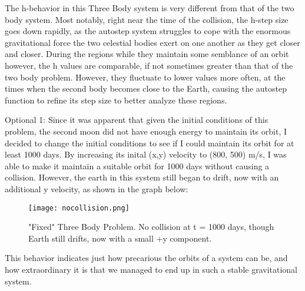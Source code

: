 \documentclass[11pt,letterpaper]{article}
\begin{document}
The h-behavior in this Three Body system is very different from that of the two body system. Most notably, right near the time of the collision, the h-step size goes down rapidly, as the autostep system struggles to cope with the enormous gravitational force the two celestial bodies exert on one another as they get closer and closer. During the regions while they maintain some semblance of an orbit however, the h values are comparable, if not sometimes greater than that of the two body problem. However, they fluctuate to lower values more often, at the times when the second body becomes close to the Earth, causing the autostep function to refine its step size to better analyze these regions.

\newpage


Optional 1: Since it was apparent that given the initial conditions of this problem, the second moon did not have enough energy to maintain its orbit, I decided to change the initial conditions to see if I could maintain its orbit for at least 1000 days. By increasing its inital (x,y) velocity to (800, 500) m/s, I was able to make it maintain a suitable orbit for 1000 days without causing a collision. However, the earth in this system still began to drift, now with an additional y velocity, as shown in the graph below:

\begin{figure}[htb!]
\begin{center}
\leavevmode
\texttt{[image: nocollision.png]}
\end{center}
\caption{"Fixed" Three Body Problem. No collision at t = 1000 days, though Earth still drifts, now with a small +y component.}
\label{fbigh}
\end{figure}

This behavior indicates just how precarious the orbits of a system can be, and how extraordinary it is that we managed to end up in such a stable gravitational system.
\end{document}
